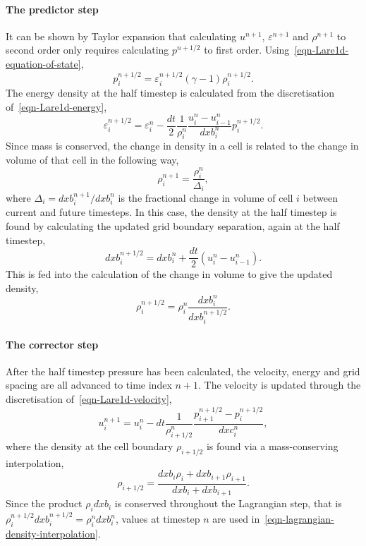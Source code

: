 \paragraph{The predictor step}
It can be shown by Taylor expansion  that calculating $u^{n+1}$, $\varepsilon^{n+1}$ and $\rho^{n+1}$ to second order only requires calculating $p^{n+1/2}$ to first order. Using~\eqref{eqn-Lare1d-equation-of-state},
\begin{equation}
  p_i^{n+1/2} = \varepsilon_i^{n+1/2}(\gamma-1)\rho_i^{n+1/2}.
  \label{eqn-predictor-pressure}
\end{equation}
The energy density at the half timestep is calculated from the discretisation of~\eqref{eqn-Lare1d-energy},
\begin{equation}
  \varepsilon_i^{n+1/2} = \varepsilon_i^{n} - \frac{dt}{2} \frac{1}{\rho_i^n} \frac{u_i^n - u_{i-1}^n}{dxb_i^n}p_i^{n+1/2}.
  \label{eqn-predictor-energy}
\end{equation}
Since mass is conserved, the change in density in a cell is related to the change in volume of that cell in the following way,
\begin{equation}
  \rho_i^{n+1} = \frac{\rho_i^{n}}{\Delta_i},
\end{equation}
where $\Delta_i = dxb_i^{n+1}/dxb_i^{n}$ is the fractional change in volume of cell $i$ between current and future timesteps. In this case, the density at the half timestep is found by calculating the updated grid boundary separation, again at the half timestep,
\begin{equation}
  dxb_i^{n+1/2} = dxb_i^n + \frac{dt}{2}(u_i^n - u_{i-1}^n).
  \label{eqn-predictor-boundary-distance}
\end{equation}
This is fed into the calculation of the change in volume to give the updated density,
\begin{equation}
  \rho_i^{n+1/2} = \rho_i^n \frac{dxb_i^n}{dxb_i^{n+1/2}}.
  \label{eqn-predictor-density}
\end{equation}

\paragraph{The corrector step}
\label{sec-corrector-step}
After the half timestep pressure has been calculated, the velocity, energy and grid spacing are all advanced to time index $n+1$. The velocity is updated through the discretisation of~\eqref{eqn-Lare1d-velocity},
\begin{equation}
  u_i^{n+1} = u_i^n - dt \frac{1}{\rho^n_{i+1/2}}\frac{p^{n+1/2}_{i+1} - p^{n+1/2}_i}{dxc_i^n},
  \label{}
\end{equation}
where the density at the cell boundary $\rho_{i+1/2}$ is found via a mass-conserving interpolation,
\begin{equation}
  \rho_{i+1/2} = \frac{dxb_i \rho_i + dxb_{i+1}\rho_{i+1}}{dxb_i + dxb_{i+1}}.
  \label{eqn-lagrangian-density-interpolation}
\end{equation}
Since the product $\rho_i dxb_i$ is conserved throughout the Lagrangian step, that is $\rho_i^{n+1/2} dxb_i^{n+1/2} = \rho_i^n dxb_i^n$, values at timestep $n$ are used in~\eqref{eqn-lagrangian-density-interpolation}.

